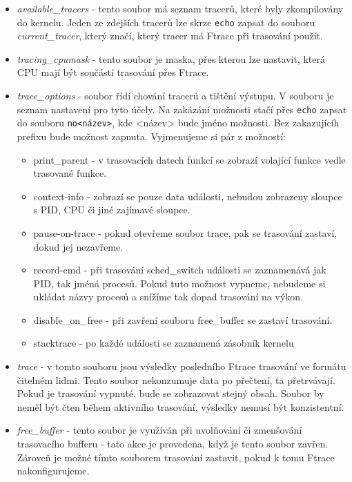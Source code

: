 \begin{itemize}
    \item \emph{available\_tracers} - tento soubor má seznam tracerů, které byly zkompilovány do kernelu. Jeden ze zdejších tracerů lze skrze \texttt{echo} zapsat do souboru \emph{current\_tracer}, který značí, který tracer má Ftrace při trasování použít.
    \item \emph{tracing\_cpumask} - tento soubor je maska, přes kterou lze nastavit, která CPU mají být součástí trasování přes Ftrace.
    \item \emph{trace\_options} - soubor řídí chování tracerů a tištění výstupu. V souboru je seznam nastavení pro tyto účely. Na zakázání možnosti stačí přes \texttt{echo} zapsat do souboru \texttt{no<název>}, kde <název> bude jméno možnosti. Bez zakazujícíh prefixu bude možnost zapnuta. Vyjmenujeme si pár z možností:
    \begin{itemize}
        \item print\_parent - v trasovacích datech funkcí se zobrazí volající funkce vedle trasované funkce.
        \item context-info - zobrazí se pouze data události, nebudou zobrazeny sloupce s PID, CPU či jiné zajímavé sloupce.
        \item pause-on-trace - pokud otevřeme soubor trace, pak se trasování zastaví, dokud jej nezavřeme.
        \item record-cmd - při trasování sched\_switch události se zaznamenává jak PID, tak jméná procesů. Pokud tuto možnost vypneme, nebudeme si ukládat názvy procesů a snížíme tak dopad trasování na výkon.
        \item disable\_on\_free - při zavření souboru free\_buffer se zastaví trasování.
        \item stacktrace - po každé události se zaznamená zásobník kernelu
    \end{itemize}
    \item \emph{trace} - v tomto souboru jsou výsledky posledního Ftrace trasování ve formátu čitelném lidmi. Tento soubor nekonzumuje data po přečtení, ta přetrvávají. Pokud je trasování vypnuté, bude se zobrazovat stejný obsah. Soubor by neměl být čten během aktivního trasování, výsledky nemusí být konzistentní.
    \item \emph{free\_buffer} - tento soubor je využíván při uvolňování či zmenšování trasovacího bufferu - tato akce je provedena, když je tento soubor zavřen. Zároveň je možné tímto souborem trasování zastavit, pokud k tomu Ftrace nakonfigurujeme.

\end{itemize}

